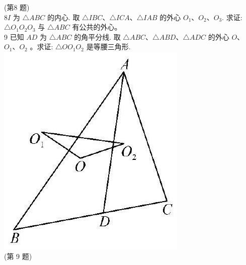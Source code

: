 \documentclass[10pt]{article}
\begin{document}
(第8 题)\\
$8 I$ 为 $\triangle A B C$ 的内心. 取 $\triangle I B C 、 \triangle I C A 、 \triangle I A B$ 的外心 $O_{1} 、 O_{2} 、 O_{3}$. 求证: $\triangle O_{1} O_{2} O_{3}$ 与 $\triangle A B C$ 有公共的外心。\\
9 已知 $A D$ 为 $\triangle A B C$ 的角平分线. 取 $\triangle A B C 、 \triangle A B D 、 \triangle A D C$ 的外心 $O 、$ $O_{1} 、 O_{2}$ 。求证: $\triangle O O_{1} O_{2}$ 是等腰三角形.\\
\includegraphics[max width=\textwidth, center]{2024_10_30_66b8e5e701da2093c133g-079}\\
(第 9 题)\\
\end{document}
